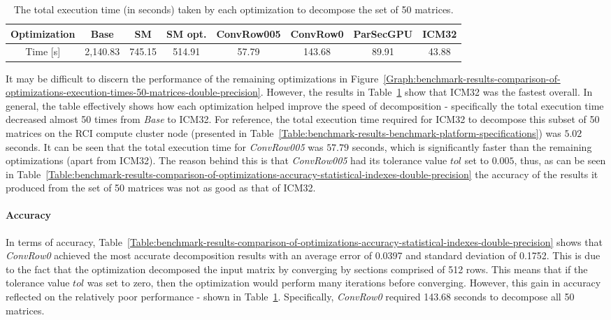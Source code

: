 \begin{table}[h!]
	\centering
	\renewcommand{\arraystretch}{1.5}
	\begin{tabular}{ |c|c|c|c|c|c|c|c| } 
		\hline
		Optimization & Base    & SM     & SM opt. & ConvRow005 & ConvRow0 & ParSecGPU & ICM32 \\
		\hline
		Time [s]     & 2,140.83 & 745.15 & 514.91  & 57.79      & 143.68   &  89.91    & 43.88 \\
		\hline
	\end{tabular}
	\caption{The total execution time (in seconds) taken by each optimization to decompose the set of 50 matrices.}
	\label{Table:benchmark-results-comparison-of-optimizations-total-execution-time}
\end{table}

It may be difficult to discern the performance of the remaining optimizations in Figure~\ref{Graph:benchmark-results-comparison-of-optimizations-execution-times-50-matrices-double-precision}. However, the results in Table~\ref{Table:benchmark-results-comparison-of-optimizations-total-execution-time} show that ICM32 was the fastest overall. In general, the table effectively shows how each optimization helped improve the speed of decomposition - specifically the total execution time decreased almost 50 times from \textit{Base} to ICM32. For reference, the total execution time required for ICM32 to decompose this subset of 50 matrices on the RCI compute cluster node (presented in Table~\ref{Table:benchmark-results-benchmark-platform-specifications}) was $ 5.02 $ seconds.
It can be seen that the total execution time for \textit{ConvRow005} was $ 57.79 $ seconds, which is significantly faster than the remaining optimizations (apart from ICM32). The reason behind this is that \textit{ConvRow005} had its tolerance value $ tol $ set to $ 0.005 $, thus, as can be seen in Table~\ref{Table:benchmark-results-comparison-of-optimizations-accuracy-statistical-indexes-double-precision} the accuracy of the results it produced from the set of 50 matrices was not as good as that of ICM32.

\paragraph{Accuracy} In terms of accuracy, Table~\ref{Table:benchmark-results-comparison-of-optimizations-accuracy-statistical-indexes-double-precision} shows that \textit{ConvRow0} achieved the most accurate decomposition results with an average error of 0.0397 and standard deviation of 0.1752. This is due to the fact that the optimization decomposed the input matrix by converging by sections comprised of 512 rows. This means that if the tolerance value $ tol $ was set to zero, then the optimization would perform many iterations before converging. However, this gain in accuracy reflected on the relatively poor performance - shown in Table~\ref{Table:benchmark-results-comparison-of-optimizations-total-execution-time}. Specifically, \textit{ConvRow0} required 143.68 seconds to decompose all 50 matrices.

